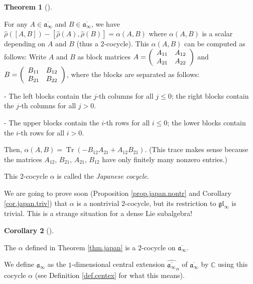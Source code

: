 \documentclass
[numbers=enddot,12pt,final,onecolumn,german,notitlepage]{scrartcl}%
\theoremstyle{definition}
\newtheorem{theo}{Theorem}
\newenvironment{theorem}[1][]
{\begin{theo}[#1]\begin{leftbar}}
{\end{leftbar}\end{theo}}
\newtheorem{coro}[theo]{Corollary}
\newenvironment{corollary}[1][]
{\begin{coro}[#1]\begin{leftbar}}
{\end{leftbar}\end{coro}}
\begin{document}
\begin{theorem}
\label{thm.japan}For any $A\in\overline{\mathfrak{a}_{\infty}}$ and
$B\in\overline{\mathfrak{a}_{\infty}}$, we have $\widehat{\rho}\left(  \left[
A,B\right]  \right)  -\left[  \widehat{\rho}\left(  A\right)  ,\widehat{\rho
}\left(  B\right)  \right]  =\alpha\left(  A,B\right)  $ where $\alpha\left(
A,B\right)  $ is a scalar depending on $A$ and $B$ (thus a $2$-cocycle). This
$\alpha\left(  A,B\right)  $ can be computed as follows: Write $A$ and $B$ as
block matrices $A=\left(
\begin{array}
[c]{cc}%
A_{11} & A_{12}\\
A_{21} & A_{22}%
\end{array}
\right)  $ and $B=\left(
\begin{array}
[c]{cc}%
B_{11} & B_{12}\\
B_{21} & B_{22}%
\end{array}
\right)  $, where the blocks are separated as follows:

- The left blocks contain the $j$-th columns for all $j\leq0$; the right
blocks contain the $j$-th columns for all $j>0$.

- The upper blocks contain the $i$-th rows for all $i\leq0$; the lower blocks
contain the $i$-th rows for all $i>0$.

Then, $\alpha\left(  A,B\right)  =\operatorname*{Tr}\left(  -B_{12}%
A_{21}+A_{12}B_{21}\right)  $. (This trace makes sense because the matrices
$A_{12}$, $B_{21}$, $A_{21}$, $B_{12}$ have only finitely many nonzero entries.)
\end{theorem}

This $2$-cocycle $\alpha$ is called the \textit{Japanese cocycle}.

We are going to prove soon (Proposition \ref{prop.japan.nontr} and Corollary
\ref{cor.japan.triv}) that $\alpha$ is a nontrivial $2$-cocycle, but its
restriction to $\mathfrak{gl}_{\infty}$ is trivial. This is a strange
situation for a dense Lie subalgebra!

\begin{corollary}
The $\alpha$ defined in Theorem \ref{thm.japan} is a $2$-cocycle on
$\overline{\mathfrak{a}_{\infty}}$.

We define $\mathfrak{a}_{\infty}$ as the $1$-dimensional central extension
$\widehat{\overline{\mathfrak{a}_{\infty}}}_{\alpha}$ of $\overline
{\mathfrak{a}_{\infty}}$ by $\mathbb{C}$ using this cocycle $\alpha$ (see
Definition \ref{def.centex} for what this means).
\end{corollary}
\end{document}
